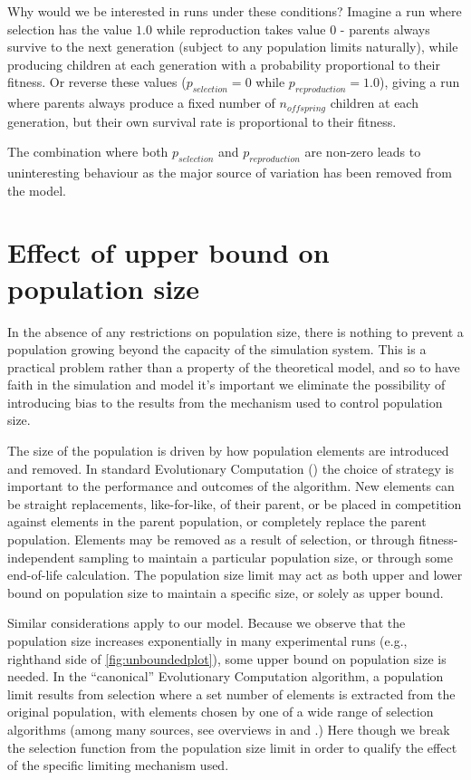 Why would we be interested in runs under these conditions? Imagine a run where selection has the value $1.0$ while reproduction takes value $0$ - parents always survive to the next generation (subject to any population limits naturally), while producing children at each generation with a probability proportional to their fitness. Or reverse these values ($p_{selection} = 0$ while $p_{reproduction} = 1.0$), giving a run where parents always produce a fixed number of $n_{offspring}$ children at each generation, but their own survival rate is proportional to their fitness.

The combination where both $p_{selection}$ and $p_{reproduction}$ are non-zero leads to uninteresting behaviour as the major source of variation has been removed from the model.

\section[Upper size bound]{Effect of upper bound on population size}\label{upper-size-bound}

In the absence of any restrictions on population size, there is nothing to prevent a population growing beyond the capacity of the simulation system. This is a practical problem rather than a property of the theoretical model, and so to have faith in the simulation and model it's important we eliminate the possibility of introducing bias to the results from the mechanism used to control population size.

The size of the population is driven by how population elements are introduced and removed. In standard Evolutionary Computation (\eg \cite[50]{DeJong2006}) the choice of strategy is important to the performance and outcomes of the algorithm. New elements can be straight replacements, like-for-like, of their parent, or be placed in competition against elements in the parent population, or completely replace the parent population. Elements may be removed as a result of selection, or through fitness-independent sampling to maintain a particular population size, or through some end-of-life calculation. The population size limit may act as both upper and lower bound on population size to maintain a specific size, or solely as upper bound.

Similar considerations apply to our model. Because we observe that the population size increases exponentially in many experimental runs (e.g., righthand side of \cref{fig:unboundedplot}), some upper bound on population size is needed. In the ``canonical'' Evolutionary Computation algorithm, a population limit results from selection where a set number of elements is extracted from the original population, with elements chosen by one of a wide range of selection algorithms (among many sources, see overviews in \cite[sect. 4.3.1]{DeJong2006} and \cite[sect. 4.2]{Vose:1999di}.) Here though we break the selection function from the population size limit in order to qualify the effect of the specific limiting mechanism used.

